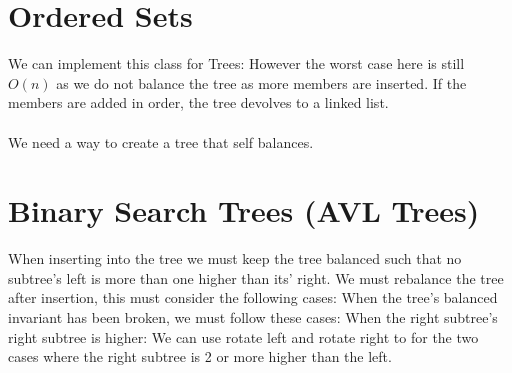\documentclass{report}
\begin{document}
    \section*{Ordered Sets}
        We can implement this class for Trees:
        However the worst case here is still $O(n)$ as we do not balance the tree as more members are inserted. If the members are added in order, the tree devolves to a linked list.
        \\
        \\ We need a way to create a tree that self balances.
    
    \section*{Binary Search Trees (AVL Trees)}
        When inserting into the tree we must keep the tree balanced such that no subtree's left is more than one higher than its' right.
        We must rebalance the tree after insertion, this must consider the following cases:
        When the tree's balanced invariant has been broken, we must follow these cases:
        When the right subtree's right subtree is higher:
        We can use rotate left and rotate right to for the two cases where the right subtree is 2 or more higher than the left.
\end{document}
